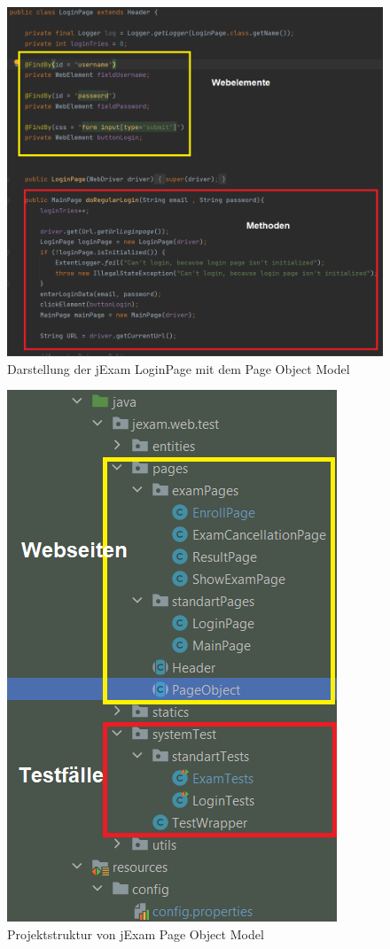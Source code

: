\begin{figure}[H]
    \centering
    \includegraphics[scale=0.5]{images/page-example}
    \caption{Darstellung der jExam LoginPage mit dem Page Object Model} \label{fig:page-exp}
\end{figure}

\begin{figure}[H]
    \centering
    \includegraphics[scale=0.6]{images/page-object}
    \caption{Projektstruktur von jExam Page Object Model} \label{fig:page-obj}
\end{figure}

